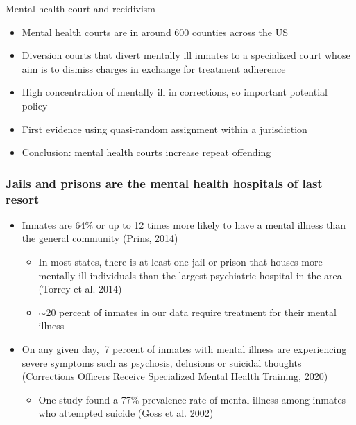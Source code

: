 \documentclass{beamer}
\begin{document}
\begin{frame}{Mental health court and recidivism}

  \begin{itemize}
    \item Mental health courts are in around 600 counties across the US
    \item Diversion courts that divert mentally ill inmates to a specialized court whose aim is to dismiss charges in exchange for treatment adherence
    \item High concentration of mentally ill in corrections, so important potential policy
    \item First evidence using quasi-random assignment within a jurisdiction
    \item Conclusion: mental health courts increase repeat offending
  \end{itemize}

\end{frame}



\begin{frame}{}
  \frametitle{Jails and prisons are the mental health hospitals of last resort}
  \begin{itemize}
    \item Inmates are 64\% or up to 12 times more likely to have a mental illness than the general community (Prins, 2014)
          \begin{itemize}
            \scriptsize
            \item In most states, there is at least one jail or prison that houses more mentally ill individuals than the largest psychiatric hospital in the area (Torrey et al. 2014)
            \item $\sim$20 percent of inmates in our data require treatment for their mental illness
          \end{itemize}
    \item On any given day, $~$7 percent of inmates with mental illness are experiencing severe symptoms such as psychosis, delusions or suicidal thoughts (Corrections Officers Receive Specialized Mental Health Training, 2020)
          \begin{itemize}
            \scriptsize
            \item One study found a 77\% prevalence rate of mental illness among inmates who attempted suicide (Goss et al. 2002)
          \end{itemize}
  \end{itemize}

\end{frame}
\end{document}
